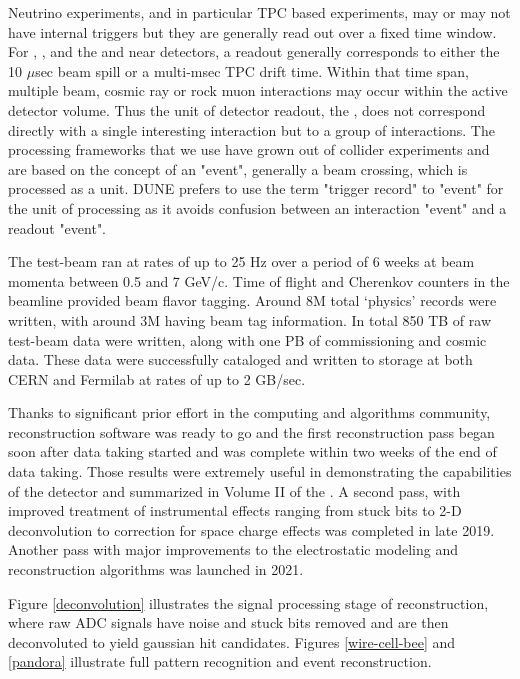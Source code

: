 \documentclass[../main-v1.tex]{subfiles}
\begin{document}
Neutrino experiments, and in particular TPC based experiments, may or may not have internal triggers but they are generally read out over a fixed time window.  For , ,  and the  and  near detectors, a readout generally corresponds to either the 10 $\mu$sec beam spill or a multi-msec TPC drift time.  Within that time span, multiple beam, cosmic ray or rock muon interactions may occur within the active detector volume.  Thus the unit of detector readout, the , does not correspond directly with a single interesting interaction but to a group of interactions. The processing frameworks that we use have grown out of collider experiments and are based on the concept of an "event", generally a beam crossing, which is processed as a unit.  DUNE prefers to use the term "trigger record" to "event" for the unit of processing as it avoids confusion between an interaction "event" and a readout "event".  


The test-beam ran at rates of up to 25 Hz over a period of 6 weeks at beam momenta between 0.5 and 7 GeV/c.  Time of flight and Cherenkov counters in the beamline provided beam flavor tagging.  Around 8M total `physics' records were written, with around 3M having beam tag information.  In total  850 TB of raw test-beam data were written, along with one PB of commissioning and cosmic data. These data were successfully cataloged and written to storage at both CERN and Fermilab at rates of up to 2 GB/sec.   

Thanks to significant prior effort in the  computing and algorithms community, reconstruction software was ready to go and the first reconstruction pass began soon after data taking started and was complete within two weeks of the end of data taking.  Those results were extremely useful in demonstrating the capabilities of the detector and summarized in Volume II of the \cite{Abi:2020evt}.  A second pass, with improved treatment of instrumental effects ranging from stuck bits to 2-D deconvolution to correction for space charge effects was completed in late 2019. Another pass with major improvements to the electrostatic modeling and reconstruction algorithms was launched in 2021. 

Figure \ref{deconvolution} illustrates the signal processing stage of reconstruction, where raw ADC signals have noise and stuck bits removed and are then deconvoluted to yield gaussian hit candidates. Figures \ref{wire-cell-bee} and \ref{pandora} illustrate full pattern recognition and event reconstruction. 
\end{document}
